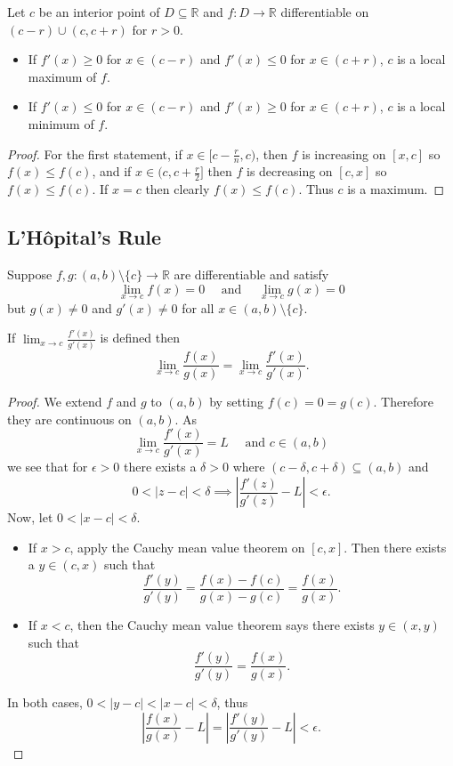 \begin{corollary}
  Let $c$ be an interior point of $D \subseteq \mathbb{R}$ and $f : D \rightarrow \mathbb{R}$ differentiable on $(c - r) \cup (c, c+ r)$ for $r > 0$.
  \begin{itemize}
    \item If $f'(x) \geq 0$ for $x \in (c - r)$ and $f'(x) \leq 0$ for $x \in (c + r)$, $c$ is a local maximum of $f$. 
    \item If $f'(x) \leq 0$ for $x \in (c - r)$ and $f'(x) \geq 0$ for $x \in (c + r)$, $c$ is a local minimum of $f$. 
  \end{itemize}
\end{corollary}
\begin{proof}
  For the first statement, if $x \in [c - \frac{r}{n}, c)$, then $f$ is increasing on $[x, c]$ so $f(x) \leq f(c)$, and if $x \in (c, c + \frac{r}{2}]$ then $f$ is decreasing on $[c, x]$ so $f(x) \leq f(c)$. If $x = c$ then clearly $f(x) \leq f(c)$. Thus $c$ is a maximum.
\end{proof}

\subsection{L'Hôpital's Rule}

\begin{theorem}
  Suppose $f, g : (a,b) \setminus \{c\} \rightarrow \mathbb{R}$ are differentiable and satisfy
  \[\lim_{x \rightarrow c} f(x) = 0 \quad \text{ and } \quad \lim_{x \rightarrow c} g(x) = 0\]
  but $g(x)\not = 0$ and $g'(x) \not = 0$ for all $x \in (a,b) \setminus \{c\}$.

  \noindent If $\lim_{x \rightarrow c} \frac{f'(x)}{g'(x)}$ is defined then
  \[\lim_{x \rightarrow c} \frac{f(x)}{g(x)} = \lim_{x \rightarrow c} \frac{f'(x)}{g'(x)}.\]
\end{theorem}
\begin{proof}
    We extend $f$ and $g$ to $(a,b)$ by setting $f(c) = 0 = g(c)$. Therefore they are continuous on $(a,b)$. As 
    \[\lim_{x \rightarrow c} \frac{f'(x)}{g'(x)} = L \quad \text{ and } c \in (a,b)\]
    we see that for $\epsilon > 0$ there exists a $\delta > 0$ where $(c-\delta, c+\delta) \subseteq (a,b)$ and
    \[0 < | z - c | < \delta \implies | \frac{f'(z)}{g'(z)} - L| < \epsilon.\]
    Now, let $0 < |x -c| < \delta$.
    \begin{itemize}
      \item If $x> c$, apply the Cauchy mean value theorem on $[c,x]$. Then there exists a $y \in (c,x)$ such that
        \[\frac{f'(y)}{g'(y)} = \frac{f(x) - f(c)}{g(x) - g(c)} = \frac{f(x)}{g(x)}.\]
      \item If $x < c$, then the Cauchy mean value theorem says there exists $y \in (x,y)$ such that
        \[\frac{f'(y)}{g'(y)} = \frac{f(x)}{g(x)}.\]
    \end{itemize}
    In both cases, $0 < |y - c| < |x - c| < \delta$, thus 
    \[\left|\frac{f(x)}{g(x)} - L \right|= \left| \frac{f'(y)}{g'(y)} - L \right| < \epsilon.\]
\end{proof}

